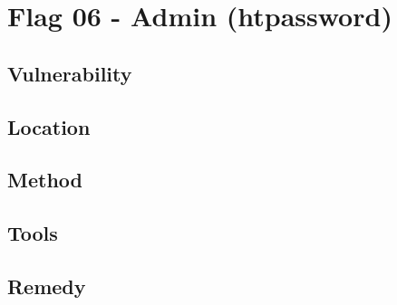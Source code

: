 \section{Flag 06 - Admin (htpassword)}

\begin{center}
\end{center}

\subsection{Vulnerability}

\subsection{Location}

\subsection{Method}

\subsection{Tools}

\subsection{Remedy}